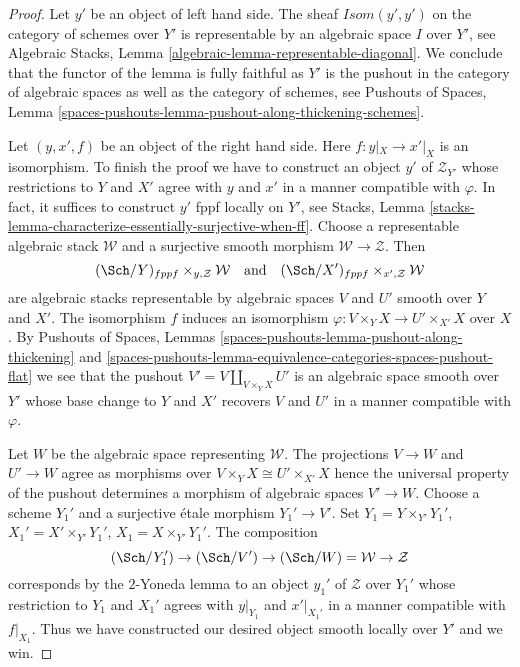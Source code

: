 \begin{proof}
Let $y'$ be an object of left hand side. The sheaf
$\mathit{Isom}(y', y')$ on the category of schemes over $Y'$
is representable by an algebraic space $I$ over $Y'$, see
Algebraic Stacks, Lemma \ref{algebraic-lemma-representable-diagonal}.
We conclude that the functor of the lemma is fully faithful as
$Y'$ is the pushout in the category of algebraic spaces as
well as the category of schemes, see
Pushouts of Spaces, Lemma
\ref{spaces-pushouts-lemma-pushout-along-thickening-schemes}.

\medskip\noindent
Let $(y, x', f)$ be an object of the right hand side. Here $f : y|_X \to x'|_X$
is an isomorphism. To finish the proof we have to construct an object $y'$ of
$\mathcal{Z}_{Y'}$ whose restrictions to $Y$ and $X'$ agree with $y$ and $x'$
in a manner compatible with $\varphi$. In fact, it suffices to construct $y'$
fppf locally on $Y'$, see
Stacks, Lemma \ref{stacks-lemma-characterize-essentially-surjective-when-ff}.
Choose a representable algebraic stack
$\mathcal{W}$ and a surjective smooth morphism $\mathcal{W} \to \mathcal{Z}$.
Then
$$
(\Sch/Y)_{fppf} \times_{y, \mathcal{Z}} \mathcal{W}
\quad\text{and}\quad
(\Sch/X')_{fppf} \times_{x', \mathcal{Z}} \mathcal{W}
$$
are algebraic stacks representable by algebraic spaces $V$ and $U'$
smooth over $Y$ and $X'$. The isomorphism $f$ induces an isomorphism
$\varphi : V \times_Y X \to U' \times_{X'} X$ over $X$. By
Pushouts of Spaces, Lemmas
\ref{spaces-pushouts-lemma-pushout-along-thickening} and
\ref{spaces-pushouts-lemma-equivalence-categories-spaces-pushout-flat}
we see that the pushout $V' = V \amalg_{V \times_Y X} U'$ is
an algebraic space smooth over $Y'$ whose base change to
$Y$ and $X'$ recovers $V$ and $U'$ in a manner compatible with $\varphi$.

\medskip\noindent
Let $W$ be the algebraic space representing $\mathcal{W}$.
The projections $V \to W$ and $U' \to W$ agree as morphisms
over $V \times_Y X \cong U' \times_{X'} X$ hence the universal
property of the pushout determines a morphism of algebraic spaces
$V' \to W$. Choose a scheme $Y_1'$ and a surjective \'etale morphism
$Y_1' \to V'$. Set $Y_1 = Y \times_{Y'} Y_1'$,
$X_1' = X' \times_{Y'} Y_1'$, $X_1 = X \times_{Y'} Y_1'$.
The composition
$$
(\Sch/Y_1') \to (\Sch/V') \to (\Sch/W) = \mathcal{W} \to \mathcal{Z}
$$
corresponds by the $2$-Yoneda lemma to an object $y_1'$ of $\mathcal{Z}$
over $Y_1'$ whose restriction to $Y_1$ and $X_1'$ agrees with $y|_{Y_1}$
and $x'|_{X_1'}$ in a manner compatible with $f|_{X_1}$. Thus we have
constructed our desired object smooth locally over $Y'$ and we win.
\end{proof}








